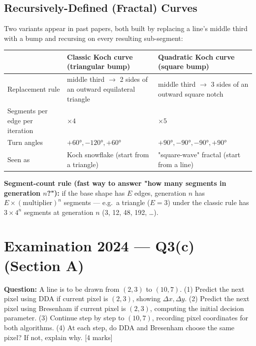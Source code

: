 \documentclass[12pt, a4paper]{article}
\newenvironment{solutionbox}{\begin{mdframed}[style=solutionframe]}{\end{mdframed}}
\begin{document}
\subsection{Recursively-Defined (Fractal) Curves}
Two variants appear in past papers, both built by replacing a line's middle third with a bump and recursing on every resulting sub-segment:
\begin{center}
\renewcommand{\arraystretch}{1.6}
\small
\begin{tabular}{p{3.1cm}|p{5.1cm}|p{5.1cm}}
\toprule
& \textbf{Classic Koch curve} (triangular bump) & \textbf{Quadratic Koch curve} (square bump) \\
\midrule
Replacement rule & middle third $\to$ 2 sides of an outward equilateral triangle & middle third $\to$ 3 sides of an outward square notch \\
Segments per edge per iteration & $\times 4$ & $\times 5$ \\
Turn angles & $+60°,-120°,+60°$ & $+90°,-90°,-90°,+90°$ \\
Seen as & Koch snowflake (start from a triangle) & "square-wave" fractal (start from a line) \\
\bottomrule
\end{tabular}
\end{center}
\textbf{Segment-count rule (fast way to answer "how many segments in generation $n$?"):} if the base shape has $E$ edges, generation $n$ has $E\times(\text{multiplier})^n$ segments --- e.g.\ a triangle ($E=3$) under the classic rule has $3\times4^n$ segments at generation $n$ (3, 12, 48, 192, \dots).

\section{Examination 2024 --- Q3(c) (Section A)}
\begin{solutionbox}
\textbf{Question:} A line is to be drawn from $(2,3)$ to $(10,7)$. (1) Predict the next pixel using DDA if current pixel is $(2,3)$, showing $\Delta x,\Delta y$. (2) Predict the next pixel using Bresenham if current pixel is $(2,3)$, computing the initial decision parameter. (3) Continue step by step to $(10,7)$, recording pixel coordinates for both algorithms. (4) At each step, do DDA and Bresenham choose the same pixel? If not, explain why. \hfill[4 marks]
\end{solutionbox}
\end{document}
